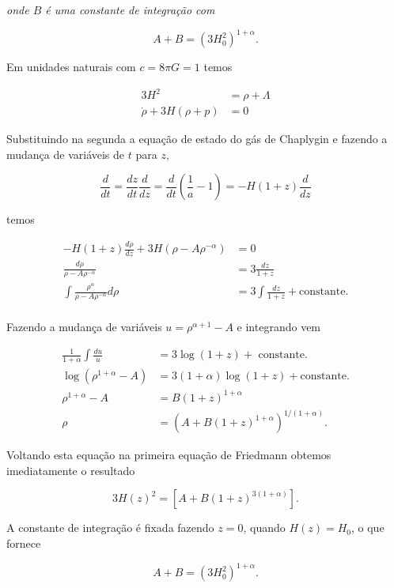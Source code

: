 \documentclass[a4paper, 12pt, notitlepage]{article}
\begin{document}
\begin{enumerate}
\textit{onde $B$ é uma constante de integração com}

\begin{equation}
  A + B = (3H_0^2)^{1+\alpha}.
\end{equation}
\vspace{1cm}

Em unidades naturais com $c = 8\pi G = 1$ temos

\begin{align*}
  3H^2 &= \rho + \Lambda \\
  \dot{\rho} + 3H\left(\rho + p\right) &= 0
\end{align*}

Substituindo na segunda a equação de estado do gás de Chaplygin e fazendo a mudança de variáveis de $t$ para $z$,

$$ \frac{d}{dt} = \frac{dz}{dt} \frac{d}{dz} = \frac{d}{dt}\left(\frac{1}{a} - 1\right) = -H(1+z)\frac{d}{dz} $$

\noindent temos

\begin{align*}
 -H(1+z)\frac{d\rho}{dz} + 3H\left(\rho - A\rho^{-\alpha}\right) &= 0\\
 \frac{d\rho}{\rho - A\rho^{-\alpha}} &= 3\frac{dz}{1 + z} \\
 \int \frac{\rho^{\alpha}}{\rho - A\rho^{-\alpha}} d\rho &= 3 \int \frac{dz}{1+z} + \text{constante.} \\
\end{align*}

Fazendo a mudança de variáveis $u = \rho^{\alpha+1} - A$ e integrando vem

\begin{align*}
  \frac{1}{1+\alpha} \int \frac{du}{u} &= 3 \log(1+z) + \text{ constante.} \\
  \log(\rho^{1 + \alpha} - A) &= 3(1+\alpha)\log(1+z) + \text{constante.} \\
  \rho^{1+\alpha} - A &= B(1+z)^{1+\alpha} \\
  \rho &= \left(A + B(1+z)^{1+\alpha}\right)^{1/(1+\alpha)}.
\end{align*}

Voltando esta equação na primeira equação de Friedmann obtemos imediatamente o resultado

\begin{equation}
  3H(z)^2 = \left[A + B(1+z)^{3(1+\alpha)}\right].
\end{equation}

A constante de integração é fixada fazendo $z = 0$, quando $H(z) = H_0$, o que fornece

\begin{equation}
  A + B = (3H_0^2)^{1+\alpha}.
\end{equation}






\end{enumerate}
\end{document}
